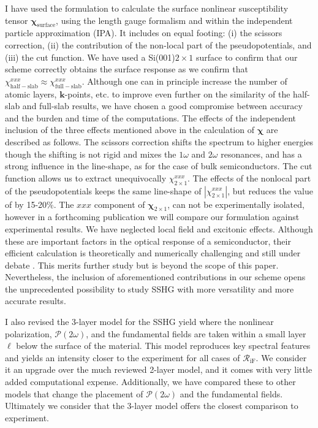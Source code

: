 I have used the formulation to calculate the surface nonlinear susceptibility
tensor $\boldsymbol{\chi}_{\mathrm{surface}}$, using the
length gauge formalism and within the independent particle approximation (IPA).
It includes on equal footing: (i) the scissors correction, (ii) the contribution
of the non-local part of the pseudopotentials, and (iii) the cut function. We
have used a Si(001)$2\times 1$ surface to confirm that our scheme correctly
obtains the surface response as we confirm that
$\chi_{\mathrm{half-slab}}^{xxx} \approx
\chi_{\mathrm{full-slab}}^{xxx}$. Although one can in
principle increase the number of atomic layers, $\mathbf{k}$-points, etc. to
improve even further on the similarity of the half-slab and full-slab results,
we have chosen a good compromise between accuracy and the burden and time of the
computations. The effects of the independent inclusion of the three effects
mentioned above in the calculation of
$\boldsymbol{\chi}$ are described as follows. The
scissors correction shifts the spectrum to higher energies though the shifting
is not rigid and mixes the $1\omega$ and $2\omega$ resonances, and has a strong
influence in the line-shape, as for the case of bulk
semiconductors.\cite{luppiJCP10,luppiPRB10,leitsmannPRB05} The cut function
allows us to extract unequivocally $\chi^{xxx}_{2\times
1}$. The effects of the nonlocal part of the
pseudopotentials keeps the same line-shape of $|\chi^{xxx}_{2\times
1}|$, but reduces the value of by 15-20\%. The $xxx$
component of $\boldsymbol{\chi}_{2\times 1}$, can not be
experimentally isolated, however in a forthcoming publication we will compare
our formulation against experimental results. We have neglected local field and
excitonic effects. Although these are important factors in the optical response
of a semiconductor, their efficient calculation is theoretically and numerically
challenging and still under debate \cite{beyond}. This merits further study but
is beyond the scope of this paper. Nevertheless, the inclusion of aforementioned
contributions in our scheme opens the unprecedented possibility to study SSHG
with more versatility and more accurate results.

I also revised the 3-layer model for the SSHG yield where the nonlinear
polarization, $\boldsymbol{\mathcal{P}}(2\omega)$, and the fundamental fields
are taken within a small layer $\ell$ below the surface of the material. This
model reproduces key spectral features and yields an intensity closer to the
experiment for all cases of $\mathcal{R}_{\mathrm{iF}}$. We consider it an
upgrade over the much reviewed 2-layer model\cite{mizrahiJOSA88}, and it comes
with very little added computational expense. Additionally, we have compared
these to other models that change the placement of
$\boldsymbol{\mathcal{P}}(2\omega)$ and the fundamental fields. Ultimately we
consider that the 3-layer model offers the closest comparison to experiment.


